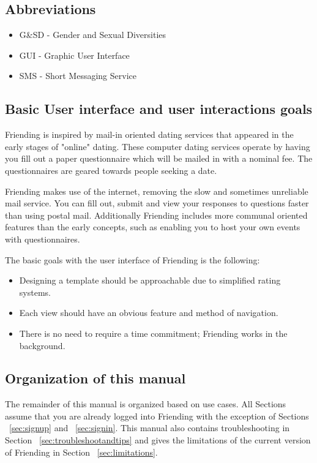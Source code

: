 \documentclass[a4paper,11pt,titlepage]{scrartcl}
\newcommand{\textapp}[1]{{\fontfamily{cmss}\selectfont#1}}
\newcommand{\Friending}{\textapp{Friending}}
\begin{document}
\subsection{Abbreviations}
\label{sec:abbreviations}
\begin{itemize}
\item G\&SD - Gender and Sexual Diversities
\item GUI - Graphic User Interface
\item SMS - Short Messaging Service
\end{itemize}

\subsection{Basic User interface and user interactions goals}
\label{sec:goals}
\Friending{} is inspired by mail-in oriented dating services that appeared in the early stages of "online" dating.  These computer dating services operate by having you fill out a paper questionnaire which will be mailed in with a nominal fee.  The questionnaires are geared towards people seeking a date.  

\Friending{} makes use of the internet, removing the slow and sometimes unreliable mail service.  You can fill out, submit and view your responses to questions faster than using postal mail.  Additionally \Friending{} includes more communal oriented features than the early concepts, such as enabling you to host your own events with questionnaires.

The basic goals with the user interface of \Friending{} is the following:
\begin{itemize}
\item Designing a template should be approachable due to simplified rating systems. 
\item Each view should have an obvious feature and method of navigation.
\item There is no need to require a time commitment; \Friending{} works in the background.
\end{itemize}

\subsection{Organization of this manual}
\label{sec:organization}
The remainder of this manual is organized based on use cases.  All Sections assume that you are already logged into \Friending{} with the exception of Sections ~\ref{sec:signup} and ~\ref{sec:signin}. This manual also contains troubleshooting in Section ~\ref{sec:troubleshootandtips} and  gives the limitations of the current version of \Friending{} in Section ~\ref{sec:limitations}.
\end{document}
